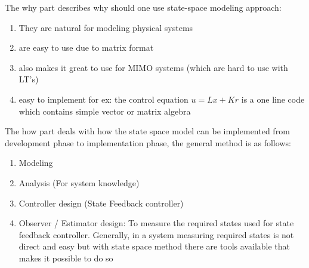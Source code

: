 The why part describes why should one use state-space modeling approach:
\begin{enumerate}
	\item They are natural for modeling physical systems
	\item are easy to use due to matrix format
	\item also makes it great to use for MIMO systems (which are hard to use with LT's)
	\item easy to implement for ex: the control equation $u = Lx + Kr$ is a one line code which contains simple vector or matrix algebra
\end{enumerate}

The how part deals with how the state space model can be implemented from development phase to implementation phase, the general method is as follows:
\begin{enumerate}
	\item Modeling
	\item Analysis (For system knowledge)
	\item Controller design (State Feedback controller)
	\item Observer / Estimator design: To measure the required states used for state feedback controller. Generally, in a system measuring required states is not direct and easy but with state space method there are tools available that makes it possible to do so
\end{enumerate}